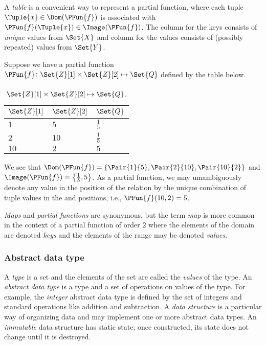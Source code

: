 \documentclass[ ../main.tex]{subfiles}
\begin{document}
A \emph{table} is a convenient way to represent a partial function, where each tuple $\Tuple{x} \in \Dom(\PFun{f})$ is associated with $\PFun{f}(\Tuple{x}) \in \Image(\PFun{f})$. The column for the keys consists of \emph{unique} values from $\Set{X}$ and column for the values consists of (possibly repeated) values from $\Set{Y}$.
\begin{example}
	Suppose we have a partial function $\PFun{f} \colon \Set{Z}[1] \times \Set{Z}[2] \mapsto \Set{Q}$ defined by the table below.
	\begin{table}[h]
		\centering
		\label{tbl:partialfunc}
		\begin{tabular}{l l l} 
			\toprule
			$\Set{Z}[1]$ & $\Set{Z}[2]$ & $\Set{Q}$\\
			\midrule
			$1$ & $5$ & $\frac{1}{5}$\\
			$2$ & $10$ & $\frac{1}{5}$\\
			$10$ & $2$ & $5$\\
			\bottomrule
		\end{tabular}
		\caption*{$\Set{Z}[1] \times \Set{Z}[2] \mapsto \Set{Q}$.}
	\end{table}
	We see that $\Dom(\PFun{f}) = \{\Pair{1}{5},\Pair{2}{10},\Pair{10}{2}\}$ and $\Image(\PFun{f}) = \left\{\frac{1}{5},5\right\}$. As a partial function, we may umambiguously denote any value in the  position of the relation by the unique combination of tuple values in the  and  positions, i.e., $\PFun{f}(10,2)=5$.
\end{example}

\emph{Maps} and \emph{partial functions} are synonymous, but the term \emph{map} is more common in the context of a partial function of order $2$ where the elements of the domain are denoted \emph{keys} and the elements of the range may be denoted \emph{values}.








\subsubsection{Abstract data type}
A \emph{type} is a set and the elements of the set are called the \emph{values} of the type. An \emph{abstract data type} is a type and a set of operations on values of the type. For example, the \emph{integer} abstract data type is defined by the set of integers and standard operations like addition and subtraction. A \emph{data structure} is a particular way of organizing data and may implement one or more abstract data types. An \emph{immutable} data structure has static state; once constructed, its state does not change until it is destroyed.
\end{document}
